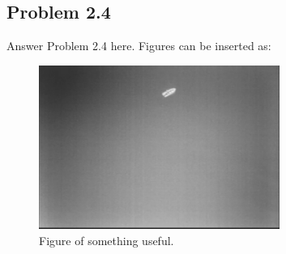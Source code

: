 \subsection*{Problem 2.4}
Answer Problem 2.4 here. Figures can be inserted as:
\begin{figure}[ht]
	\centering
	\includegraphics[width=0.7\textwidth]{fig1} %
	\caption{Figure of something useful.}
	\label{fig:fig1}
\end{figure}


